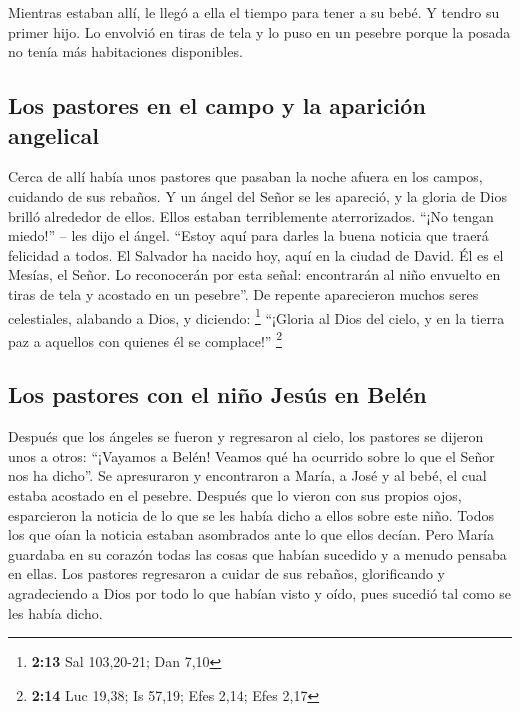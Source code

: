  Mientras estaban allí, le llegó a ella el tiempo para
tener a su bebé.  Y tendro su primer hijo. Lo envolvió en
tiras de tela y lo puso en un pesebre porque la posada no tenía más
habitaciones disponibles.

\hypertarget{los-pastores-en-el-campo-y-la-apariciuxf3n-angelical}{%
\subsection{Los pastores en el campo y la aparición
angelical}\label{los-pastores-en-el-campo-y-la-apariciuxf3n-angelical}}

 Cerca de allí había unos pastores que pasaban la noche
afuera en los campos, cuidando de sus rebaños.  Y un ángel
del Señor se les apareció, y la gloria de Dios brilló alrededor de
ellos. Ellos estaban terriblemente aterrorizados.  ``¡No
tengan miedo!'' -- les dijo el ángel. ``Estoy aquí para darles la buena
noticia que traerá felicidad a todos.  El Salvador ha
nacido hoy, aquí en la ciudad de David. Él es el Mesías, el Señor.
 Lo reconocerán por esta señal: encontrarán al niño
envuelto en tiras de tela y acostado en un pesebre''.  De
repente aparecieron muchos seres celestiales, alabando a Dios, y
diciendo: \footnote{\textbf{2:13} Sal 103,20-21; Dan 7,10}
 ``¡Gloria al Dios del cielo, y en la tierra paz a
aquellos con quienes él se complace!'' \footnote{\textbf{2:14} Luc
  19,38; Is 57,19; Efes 2,14; Efes 2,17}

\hypertarget{los-pastores-con-el-niuxf1o-jesuxfas-en-beluxe9n}{%
\subsection{Los pastores con el niño Jesús en
Belén}\label{los-pastores-con-el-niuxf1o-jesuxfas-en-beluxe9n}}

 Después que los ángeles se fueron y regresaron al cielo,
los pastores se dijeron unos a otros: ``¡Vayamos a Belén! Veamos qué ha
ocurrido sobre lo que el Señor nos ha dicho''.  Se
apresuraron y encontraron a María, a José y al bebé, el cual estaba
acostado en el pesebre.  Después que lo vieron con sus
propios ojos, esparcieron la noticia de lo que se les había dicho a
ellos sobre este niño.  Todos los que oían la noticia
estaban asombrados ante lo que ellos decían.  Pero María
guardaba en su corazón todas las cosas que habían sucedido y a menudo
pensaba en ellas.  Los pastores regresaron a cuidar de
sus rebaños, glorificando y agradeciendo a Dios por todo lo que habían
visto y oído, pues sucedió tal como se les había dicho.

